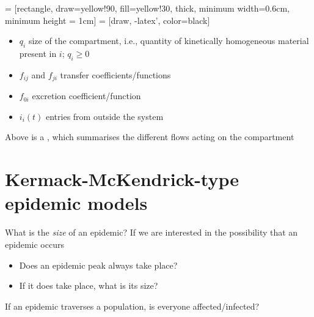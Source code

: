 \documentclass[aspectratio=169]{beamer}\usepackage[]{graphicx}\usepackage[]{xcolor}
\begin{document}
\begin{frame}{}
  \begin{minipage}{0.4\textwidth}
     = [rectangle, 
    draw=yellow!90, 
    fill=yellow!30, 
    thick, 
    minimum width=0.6cm,
    minimum height = 1cm]
     = [draw, 
    -latex', 
    color=black]
  \end{minipage}
  \begin{minipage}{0.55\textwidth}
    \begin{itemize}
      \item $q_i$ size of the compartment, i.e., quantity of kinetically homogeneous material present in $i$; $q_i\geq 0$ 
      \item $f_{ij}$ and $f_{ji}$ transfer coefficients/functions
      \item $f_{0i}$ excretion coefficient/function
      \item $i_i(t)$ entries from outside the system
    \end{itemize}
  \end{minipage}
  \vfill
  Above is a , which summarises the different flows acting on the compartment
\end{frame}


\section{Kermack-McKendrick-type epidemic models}

\nocite{KermackMcKendrick1927}

\begin{frame}{What is the \emph{size} of an epidemic?}
\bbullet 
If we are interested in the possibility that an epidemic occurs
\begin{itemize}
  \item Does an epidemic peak always take place?
  \item If it does take place, what is its size?
\end{itemize}
\vfill
\bbullet If an epidemic traverses a population, is everyone affected/infected?
\end{frame}
\end{document}
